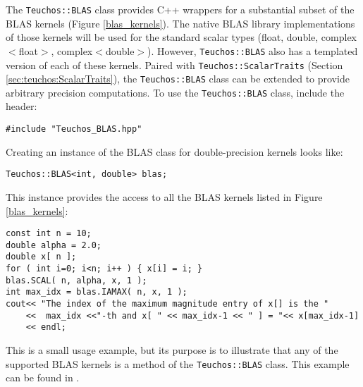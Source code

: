 The \verb!Teuchos::BLAS! class provides C++ wrappers for a substantial subset of the 
BLAS kernels (Figure \ref{blas_kernels}).
The native BLAS library implementations of those kernels
will be used for the standard scalar types (float, double, complex$<$float$>$, complex$<$double$>$).  
However, \verb!Teuchos::BLAS! also has a
templated version of each of these kernels.  Paired with \verb!Teuchos::ScalarTraits! 
(Section \ref{sec:teuchos:ScalarTraits}), the \verb!Teuchos::BLAS! class can be extended 
to provide arbitrary precision computations.  
To use the \verb!Teuchos::BLAS! class, 
include the header:
{\small 
\begin{verbatim}
#include "Teuchos_BLAS.hpp"
\end{verbatim}}
Creating an instance of the BLAS class for double-precision kernels looks like:
{\small 
\begin{verbatim}
Teuchos::BLAS<int, double> blas;
\end{verbatim}}
This instance provides the access to all the BLAS kernels listed in Figure \ref{blas_kernels}:
{\small
\begin{verbatim}
const int n = 10;
double alpha = 2.0;
double x[ n ];
for ( int i=0; i<n; i++ ) { x[i] = i; }
blas.SCAL( n, alpha, x, 1 );
int max_idx = blas.IAMAX( n, x, 1 );
cout<< "The index of the maximum magnitude entry of x[] is the "
    <<  max_idx <<"-th and x[ " << max_idx-1 << " ] = "<< x[max_idx-1] 
    << endl;
\end{verbatim}}
This is a small usage example, but its purpose is to illustrate that any of the supported 
BLAS kernels is a method of the {\tt Teuchos::BLAS} class.  
This example can be found in .  

